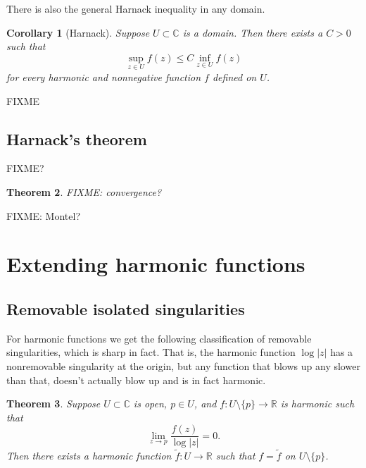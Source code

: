 \documentclass[12pt,openany]{book}
\newcommand{\sabs}[1]{\lvert {#1} \rvert}
\newcommand{\C}{{\mathbb{C}}}
\newcommand{\R}{{\mathbb{R}}}
\theoremstyle{plain}
\newtheorem{thm}{Theorem}[section]
\newtheorem{cor}[thm]{Corollary}
\theoremstyle{remark}
\theoremstyle{definition}
\theoremstyle{exercise}
\theoremstyle{example}
\begin{document}
There is also the general Harnack inequality in any domain.

\begin{cor}[Harnack]
Suppose $U \subset \C$ is a domain.  Then there exists a $C > 0$ such
that
\begin{equation*}
\sup_{z \in U} f(z) \leq C \inf_{z\in U} f(z)
\end{equation*}
for every harmonic and nonnegative function $f$ defined on $U$.
\end{cor}

FIXME

\subsection{Harnack's theorem}

FIXME?

\begin{thm}
FIXME: convergence?
\end{thm}

FIXME: Montel?

%


\section{Extending harmonic functions}

\subsection{Removable isolated singularities}

For harmonic functions we get the following classification of removable
singularities, which is sharp in fact.  That is, the harmonic function $\log
\sabs{z}$ has a nonremovable singularity at the origin, but any function
that blows up any slower than that, doesn't actually blow up and is in fact
harmonic.

\begin{thm}
Suppose $U \subset \C$ is open, $p \in U$, and $f \colon U \setminus \{ p \}
\to \R$ is harmonic such that
\begin{equation*}
\lim_{z\to p} \frac{f(z)}{\log \sabs{z}} = 0 .
\end{equation*}
Then there exists a harmonic function $\tilde{f} \colon U \to \R$ such that
$f = \tilde{f}$ on $U \setminus \{ p \}$.
\end{thm}
\end{document}
